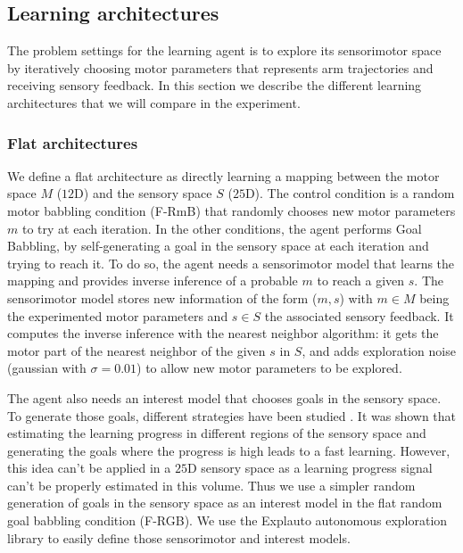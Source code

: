 \documentclass[10pt,letterpaper]{article}
\begin{document}
		
	
	\subsection{Learning architectures}

		The problem settings for the learning agent is to explore its sensorimotor space by iteratively choosing motor parameters that represents arm trajectories and receiving sensory feedback.
		In this section we describe the different learning architectures that we will compare in the experiment.
		
		\subsubsection{Flat architectures}
			
			We define a flat architecture as directly learning a mapping between the motor space $M$ ($12$D) and the sensory space $S$ ($25$D).
			The control condition is a random motor babbling condition (F-RmB) that randomly chooses new motor parameters $m$ to try at each iteration.
			In the other conditions, the agent performs Goal Babbling, by self-generating a goal in the sensory space at each iteration and trying to reach it.
			To do so, the agent needs a sensorimotor model that learns the mapping and provides inverse inference of a probable $m$ to reach a given $s$.
			The sensorimotor model stores new information of the form ($m, s$) with $m \in M$ being the experimented motor parameters and $s \in S$ the associated sensory feedback. 
			It computes the inverse inference with the nearest neighbor algorithm: 
			it gets the motor part of the nearest neighbor of the given $s$ in $S$, and adds exploration noise (gaussian with $\sigma=0.01$) to allow new motor parameters to be explored.
			
			The agent also needs an interest model that chooses goals in the sensory space.
			To generate those goals, different strategies have been studied \cite{baranes_active_2013}. 
			It was shown that estimating the learning progress in different regions of the sensory space and generating the goals where the progress is high leads to a fast learning.
			However, this idea can't be applied in a $25$D sensory space as a learning progress signal can't be properly estimated in this volume.
			Thus we use a simpler random generation of goals in the sensory space as an interest model in the flat random goal babbling condition (F-RGB).
			We use the Explauto autonomous exploration library \cite{moulin-frier_explauto:_2014} to easily define those sensorimotor and interest models.\\
			
\end{document}

